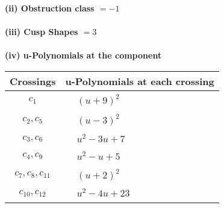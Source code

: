 \documentclass[1p]{elsarticle_modified}
\theoremstyle{definition}
\begin{document}
\flushleft \textbf{(ii) Obstruction class $= -1$}\\~\\
\flushleft \textbf{(iii) Cusp Shapes $= 3$}\\~\\
\newpage\renewcommand{\arraystretch}{1}
\flushleft \textbf{(iv) u-Polynomials at the component}\newline \\
\begin{tabular}{m{50pt}|m{274pt}}
Crossings & \hspace{64pt}u-Polynomials at each crossing \\
\hline $$\begin{aligned}c_{1}\end{aligned}$$&$\begin{aligned}
&(u+9)^2
\end{aligned}$\\
\hline $$\begin{aligned}c_{2},c_{5}\end{aligned}$$&$\begin{aligned}
&(u-3)^2
\end{aligned}$\\
\hline $$\begin{aligned}c_{3},c_{6}\end{aligned}$$&$\begin{aligned}
&u^2-3 u+7
\end{aligned}$\\
\hline $$\begin{aligned}c_{4},c_{9}\end{aligned}$$&$\begin{aligned}
&u^2- u+5
\end{aligned}$\\
\hline $$\begin{aligned}c_{7},c_{8},c_{11}\end{aligned}$$&$\begin{aligned}
&(u+2)^2
\end{aligned}$\\
\hline $$\begin{aligned}c_{10},c_{12}\end{aligned}$$&$\begin{aligned}
&u^2-4 u+23
\end{aligned}$\\
\hline
\end{tabular}\\~\\
\newpage\renewcommand{\arraystretch}{1}
\end{document}
